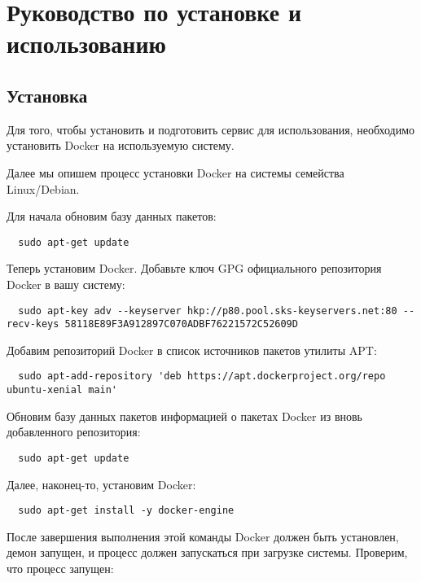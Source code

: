 \section{Руководство по установке и использованию}
\label{sec:manual}

\subsection{Установка}
\label{sec:manual:install}

Для того, чтобы установить и подготовить сервис для использования, необходимо установить Docker на используемую систему.

Далее мы опишем процесс установки Docker на системы семейства Linux/Debian.

Для начала обновим базу данных пакетов:

\begin{lstlisting}
  sudo apt-get update
\end{lstlisting}

Теперь установим Docker. Добавьте ключ GPG официального репозитория Docker в вашу систему:

\begin{lstlisting}
  sudo apt-key adv --keyserver hkp://p80.pool.sks-keyservers.net:80 --recv-keys 58118E89F3A912897C070ADBF76221572C52609D
\end{lstlisting}

Добавим репозиторий Docker в список источников пакетов утилиты APT:

\begin{lstlisting}
  sudo apt-add-repository 'deb https://apt.dockerproject.org/repo ubuntu-xenial main'
\end{lstlisting}

Обновим базу данных пакетов информацией о пакетах Docker из вновь добавленного репозитория:

\begin{lstlisting}
  sudo apt-get update
\end{lstlisting}

Далее, наконец-то, установим Docker:

\begin{lstlisting}
  sudo apt-get install -y docker-engine
\end{lstlisting}

После завершения выполнения этой команды Docker должен быть установлен, демон запущен, и процесс должен запускаться при загрузке системы. Проверим, что процесс запущен:

